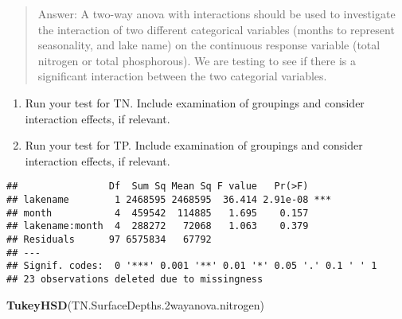 \documentclass[]{article}
\newenvironment{Shaded}{\begin{snugshade}}{\end{snugshade}}
\newcommand{\CommentTok}[1]{\textcolor[rgb]{0.56,0.35,0.01}{\textit{#1}}}
\newcommand{\DataTypeTok}[1]{\textcolor[rgb]{0.13,0.29,0.53}{#1}}
\newcommand{\FloatTok}[1]{\textcolor[rgb]{0.00,0.00,0.81}{#1}}
\newcommand{\KeywordTok}[1]{\textcolor[rgb]{0.13,0.29,0.53}{\textbf{#1}}}
\newcommand{\NormalTok}[1]{#1}
\newcommand{\OperatorTok}[1]{\textcolor[rgb]{0.81,0.36,0.00}{\textbf{#1}}}
\newcommand{\StringTok}[1]{\textcolor[rgb]{0.31,0.60,0.02}{#1}}
\begin{document}
\begin{quote}
Answer: A two-way anova with interactions should be used to investigate
the interaction of two different categorical variables (months to
represent seasonality, and lake name) on the continuous response
variable (total nitrogen or total phosphorous). We are testing to see if
there is a significant interaction between the two categorial variables.
\end{quote}

\begin{enumerate}
\def\labelenumi{\arabic{enumi}.}
\setcounter{enumi}{4}
\item
  Run your test for TN. Include examination of groupings and consider
  interaction effects, if relevant.
\item
  Run your test for TP. Include examination of groupings and consider
  interaction effects, if relevant.
\end{enumerate}

\begin{Shaded}
\end{Shaded}

\begin{verbatim}
##                Df  Sum Sq Mean Sq F value   Pr(>F)    
## lakename        1 2468595 2468595  36.414 2.91e-08 ***
## month           4  459542  114885   1.695    0.157    
## lakename:month  4  288272   72068   1.063    0.379    
## Residuals      97 6575834   67792                     
## ---
## Signif. codes:  0 '***' 0.001 '**' 0.01 '*' 0.05 '.' 0.1 ' ' 1
## 23 observations deleted due to missingness
\end{verbatim}

\begin{Shaded}
\begin{Highlighting}[]
\KeywordTok{TukeyHSD}\NormalTok{(TN.SurfaceDepths}\FloatTok{.2}\NormalTok{wayanova.nitrogen)}
\end{Highlighting}
\end{Shaded}
\end{document}

